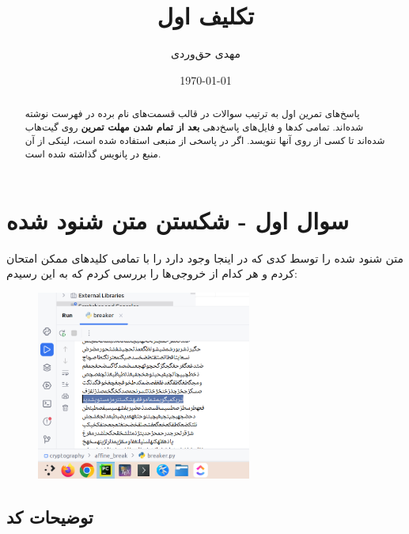 \documentclass{article}
\title{تکلیف اول}
\author{مهدی حق‌وردی}
\date{\today}
\begin{document}
\maketitle
\tableofcontents

\begin{abstract}
پاسخ‌های تمرین اول به ترتیب سوالات در قالب قسمت‌‌‌‌های نام برده در فهرست نوشته شده‌اند. تمامی کد‌ها و فایل‌های پاسخ‌دهی \textbf{بعد از تمام شدن مهلت تمرین} روی گیت‌هاب  شده‌اند تا کسی از روی ‌آنها ننویسد. اگر در پاسخی از منبعی استفاده شده است، لینکی از آن منبع در پانویس گذاشته شده است.
\end{abstract}
\newpage
\section{سوال اول - شکستن متن شنود شده}
متن شنود شده را توسط کدی که در اینجا
وجود دارد را با تمامی کلید‌‌های ممکن امتحان کردم و هر کدام از خروجی‌ها را بررسی کردم که به این رسیدم:
\begin{figure}[H]
\begin{center}
\includegraphics[width=0.63\textwidth, height=0.4\textheight]{images/found}
\end{center}
\end{figure}

\subsection{توضیحات کد}
\end{document}
